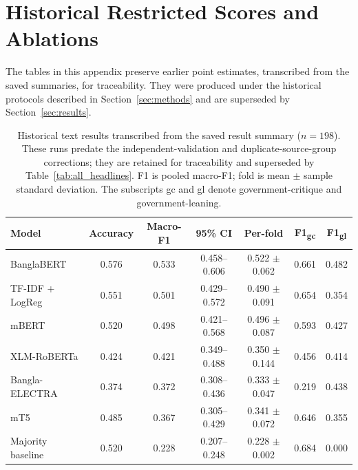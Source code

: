 \documentclass[11pt]{article}
\begin{document}
\section{Historical Restricted Scores and Ablations}\label{sec:historical}
The tables in this appendix preserve earlier point estimates, transcribed from the saved summaries, for traceability. They were produced under the historical protocols described in Section~\ref{sec:methods} and are superseded by Section~\ref{sec:results}.
\begin{table}[ht]
\footnotesize
\centering
\caption{Historical text results transcribed from the saved result summary ($n=198$). These runs predate the independent-validation and duplicate-source-group corrections; they are retained for traceability and superseded by Table~\ref{tab:all_headlines}. F1 is pooled macro-F1; fold is mean $\pm$ sample standard deviation. The subscripts gc and gl denote government-critique and government-leaning.}
\begin{tabular}{|l|c|c|c|c|c|c|}
\hline
\textbf{Model} & \textbf{Accuracy} & \textbf{Macro-F1} & \textbf{95\% CI} & \textbf{Per-fold} & \textbf{F1\textsubscript{gc}} & \textbf{F1\textsubscript{gl}} \\
\hline
BanglaBERT        & 0.576 & 0.533 & 0.458--0.606 & 0.522 $\pm$ 0.062 & 0.661 & 0.482 \\
TF-IDF + LogReg   & 0.551 & 0.501 & 0.429--0.572 & 0.490 $\pm$ 0.091 & 0.654 & 0.354 \\
mBERT             & 0.520 & 0.498 & 0.421--0.568 & 0.496 $\pm$ 0.087 & 0.593 & 0.427 \\
XLM-RoBERTa       & 0.424 & 0.421 & 0.349--0.488 & 0.350 $\pm$ 0.144 & 0.456 & 0.414 \\
Bangla-ELECTRA    & 0.374 & 0.372 & 0.308--0.436 & 0.333 $\pm$ 0.047 & 0.219 & 0.438 \\
mT5               & 0.485 & 0.367 & 0.305--0.429 & 0.341 $\pm$ 0.072 & 0.646 & 0.355 \\
Majority baseline & 0.520 & 0.228 & 0.207--0.248 & 0.228 $\pm$ 0.002 & 0.684 & 0.000 \\
\hline
\end{tabular}
\label{tab:text_models}
\end{table}
\end{document}
